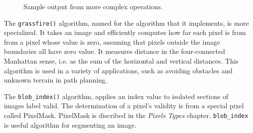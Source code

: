 \begin{figure}[hp]
\centering
  \hfill
  \hfill
  \hfill
\caption{Sample output from more complex operations.}
\label{fig:complex}
\end{figure}

The \verb#grassfire()# algorithm, named for the algorithm that 
it implements, is more specialized.  It takes an image and 
efficiently computes how far each pixel is from from a pixel 
whose value is zero, assuming that pixels outside the image 
boundaries all have zero value.  It measures distance in the 
four-connected Manhattan sense, i.e. as the sum of the 
horizontal and vertical distances.  This algorithm is used in 
a variety of applications, such as avoiding obstacles and 
unknown terrain in path planning.

The \verb#blob_index()# algorithm, applies an index value to isolated
sections of images label valid. The determination of a pixel's
validity is from a special pixel called PixelMask. PixelMask is
discribed in the \emph{Pixels Types} chapter. \verb#blob_index# is
useful algorithm for segmenting an image.





